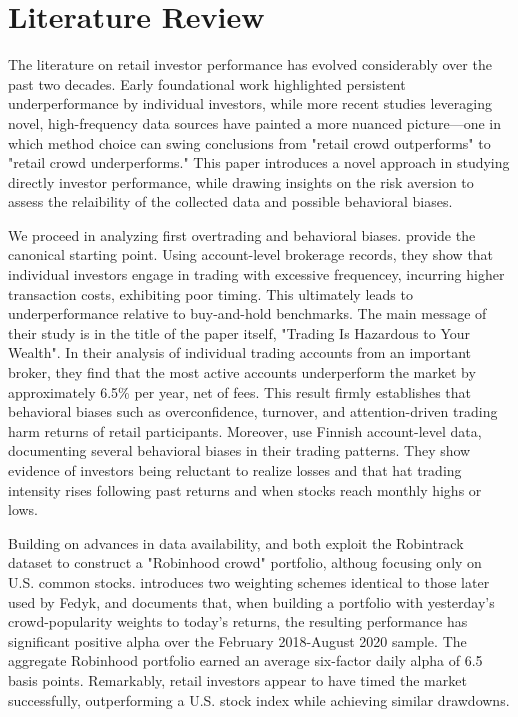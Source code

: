 \section{Literature Review}

The literature on retail investor performance has evolved considerably over the past two decades. 
Early foundational work highlighted persistent underperformance by individual investors, while more recent studies leveraging novel, high-frequency data sources have painted a more nuanced picture—one in which method choice can swing conclusions from "retail crowd outperforms" to "retail crowd underperforms."
This paper introduces a novel approach in studying directly investor performance, while drawing insights on the risk aversion to assess the relaibility of the collected data and possible behavioral biases.

We proceed in analyzing first overtrading and behavioral biases. 
\cite{BarberOdean2000}  provide the canonical starting point. Using account-level brokerage records, they show that individual investors engage in trading with excessive frequencey, incurring higher transaction costs, 
exhibiting poor timing. This ultimately leads to underperformance relative to buy-and-hold benchmarks.
The main message of their study is in the title of the paper itself, "Trading Is Hazardous to Your Wealth".  
In their analysis of individual trading accounts from an important broker, they find that the most active accounts underperform the market by approximately 6.5\% per year, net of fees. 
This result firmly establishes that behavioral biases such as overconfidence, turnover, and attention-driven trading harm returns of retail participants.
Moreover, \cite{Grinblatt2001} use Finnish account-level data, documenting several behavioral biases in  their trading patterns.
They show evidence of investors being reluctant to realize losses and that hat trading intensity rises following past returns and when stocks reach monthly highs or lows.

Building on advances in data availability, \cite{Welch2022} and \cite{Fedyk2024} both exploit the Robintrack dataset to construct a "Robinhood crowd" portfolio, 
althoug focusing only on U.S. common stocks.
\cite{Welch2022} introduces two weighting schemes identical to those later used by Fedyk, and documents that, when building a portfolio with yesterday's crowd-popularity weights to today's returns, the resulting performance has significant positive alpha over the February 2018-August 2020 sample. 
The aggregate Robinhood portfolio earned an average six-factor daily alpha of 6.5 basis points.
Remarkably, retail investors appear to have timed the market successfully, outperforming a U.S. stock index while achieving similar drawdowns.

